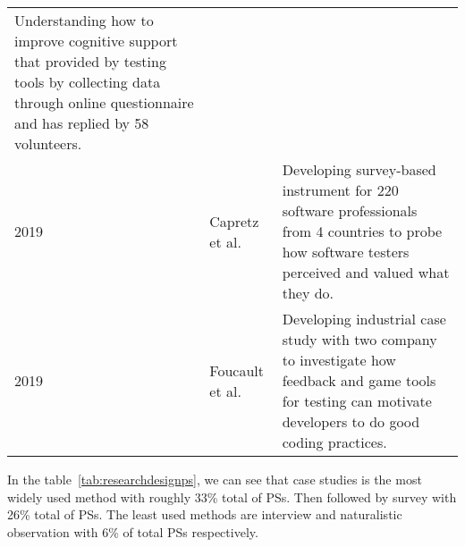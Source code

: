 \documentclass[conference, compsoc, twoside]{IEEEtran}
\begin{document}
\begin{table*}[h]
\begin{tabular}{p{0.6cm} |p{2cm}| p{12cm}}
         Understanding how to improve cognitive support that provided by testing tools by collecting data through online questionnaire and has replied by 58 volunteers.\\     
      2019 & Capretz et al.~\cite{Capretz2019262} &
         Developing survey-based instrument for 220 software professionals from 4 countries to probe how software testers perceived and valued what they do.  \\      
      2019 & Foucault et al.~\cite{Foucault20193731} &
         Developing industrial case study with two company to investigate how feedback and game tools for testing can motivate developers to do good coding practices.\\      
    \end{tabular}
\end{table*}
In the table~\ref{tab:researchdesignps}, we can see that case studies is the most widely used method with roughly 33\% total of PSs. Then followed by survey with 26\% total of PSs.
The least used methods are interview and naturalistic observation with 6\% of total PSs respectively.
\end{document}
